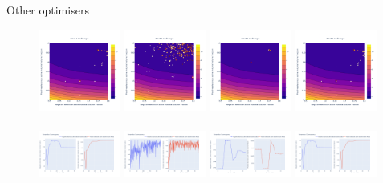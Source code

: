 \documentclass[aspectratio=169]{beamer} %
\begin{document}
\begin{frame}{Other optimisers}
    \vspace{-6mm}
    \begin{figure}
        \centering
        \includegraphics[width=0.24\textwidth]{Images/Optimisers/nlopt_cost.png}
        \includegraphics[width=0.24\textwidth]{Images/Optimisers/pso_cost.png}
        \includegraphics[width=0.24\textwidth]{Images/Optimisers/scipyde_cost.png}
        \includegraphics[width=0.24\textwidth]{Images/Optimisers/nlopt_cost.png} ~~~~\\
        \includegraphics[width=0.24\textwidth]{Images/Optimisers/nlopt_params.png}
        \includegraphics[width=0.24\textwidth]{Images/Optimisers/pso_params.png}
        \includegraphics[width=0.24\textwidth]{Images/Optimisers/scipyde_params.png}
        \includegraphics[width=0.24\textwidth]{Images/Optimisers/nlopt_params.png}
        \label{fig:optimisers2}
    \end{figure}
\end{frame}
\end{document}
